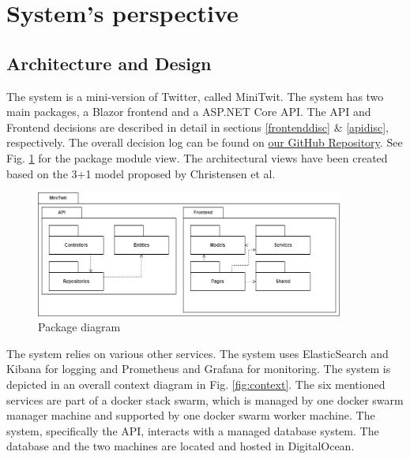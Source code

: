 \documentclass[10pt]{article}
\begin{document}
\section{System's perspective}

\subsection{Architecture and Design}
The system is a mini-version of Twitter, called MiniTwit.
The system has two main packages, a Blazor frontend and a ASP.NET Core API. The API and Frontend decisions are described in detail in sections \ref{frontenddisc} \& \ref{apidisc}, respectively. The overall decision log can be found on \href{https://github.com/Arklaide/devopsITUproject/blob/main/report/sub-reports/decision_log.md}{our GitHub Repository}. See Fig. \ref{fig:package} for the package module view. The architectural views have been created based on the 3+1 model proposed by Christensen et al\cite{christensen20163+}.

\begin{figure} [H]
  \centering
  \includegraphics[width=0.9\textwidth]{images/devops-overall_module_view.png}
  \caption{Package diagram}
  \label{fig:package}
\end{figure}

The system relies on various other services. The system uses ElasticSearch and Kibana for logging and Prometheus and Grafana for monitoring. The system is depicted in an overall context diagram in Fig. \ref{fig:context}. The six mentioned services are part of a docker stack swarm, which is managed by one docker swarm manager machine and supported by one docker swarm worker machine. The system, specifically the API, interacts with a managed database system. The database and the two machines are located and hosted in DigitalOcean.
\end{document}
